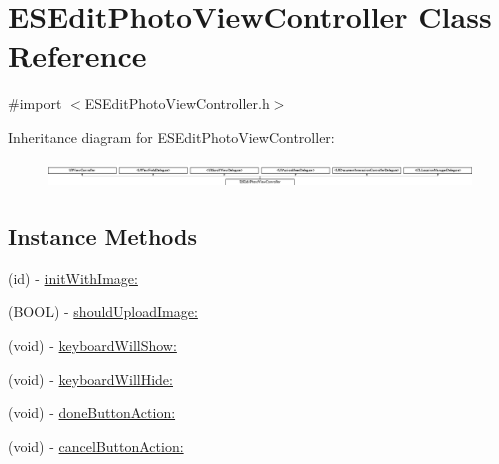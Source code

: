 \hypertarget{interface_e_s_edit_photo_view_controller}{}\section{E\+S\+Edit\+Photo\+View\+Controller Class Reference}
\label{interface_e_s_edit_photo_view_controller}


{\ttfamily \#import $<$E\+S\+Edit\+Photo\+View\+Controller.\+h$>$}

Inheritance diagram for E\+S\+Edit\+Photo\+View\+Controller\+:\begin{figure}[H]
\begin{center}
\leavevmode
\includegraphics[height=0.701754cm]{interface_e_s_edit_photo_view_controller}
\end{center}
\end{figure}
\subsection*{Instance Methods}
\begin{DoxyCompactItemize}
\item 
(id) -\/ \hyperlink{interface_e_s_edit_photo_view_controller_aafd404376566c70889387a11d8ae763f}{init\+With\+Image\+:}
\item 
(B\+O\+O\+L) -\/ \hyperlink{interface_e_s_edit_photo_view_controller_a0b244f052866fcda805b619cfbe21d50}{should\+Upload\+Image\+:}
\item 
(void) -\/ \hyperlink{interface_e_s_edit_photo_view_controller_aa6118fdd6577b5cdd3176f673ad271c5}{keyboard\+Will\+Show\+:}
\item 
(void) -\/ \hyperlink{interface_e_s_edit_photo_view_controller_ab5c0e10dba0d3999ddac31c8593501ae}{keyboard\+Will\+Hide\+:}
\item 
(void) -\/ \hyperlink{interface_e_s_edit_photo_view_controller_ac69d2dce1a796b51b8ffef32bb4592a7}{done\+Button\+Action\+:}
\item 
(void) -\/ \hyperlink{interface_e_s_edit_photo_view_controller_aba52ab4e9157852a9f4c2ccded564a16}{cancel\+Button\+Action\+:}
\end{DoxyCompactItemize}
